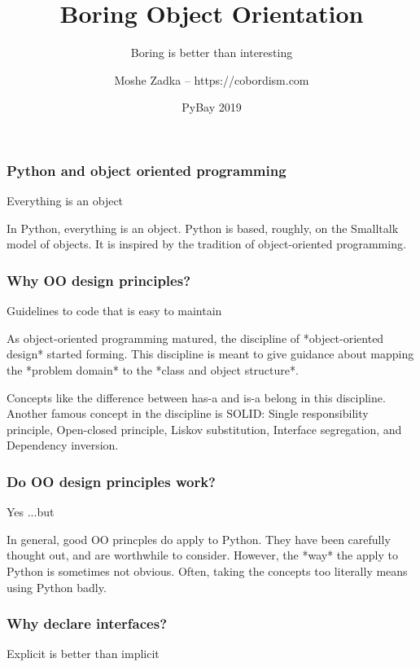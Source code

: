 \usepackage{listings}
\usepackage{textcomp}
\usepackage{fancyvrb}

\title{Boring Object Orientation}
\subtitle{Boring is better than interesting}
\author{Moshe Zadka -- https://cobordism.com}
\date{PyBay 2019}


\begin{titlepage}
\maketitle
\end{titlepage}

\frame{\titlepage}

\begin{frame}[fragile]
\frametitle{Python and object oriented programming}

Everything is an object
\end{frame}

In Python,
everything is an object.
Python is based,
roughly,
on the Smalltalk model of objects.
It is inspired by the tradition of object-oriented programming.

\begin{frame}[fragile]
\frametitle{Why OO design principles?}

Guidelines to code that is easy to maintain
\end{frame}

As object-oriented programming matured,
the discipline of
*object-oriented design* started forming.
This discipline is meant to give guidance
about mapping the
*problem domain*
to the
*class and object structure*.

Concepts like the difference between
has-a
and
is-a
belong in this discipline.
Another famous concept in the discipline
is
SOLID:
Single responsibility principle,
Open-closed principle,
Liskov substitution,
Interface segregation,
and Dependency inversion.

\begin{frame}[fragile]
\frametitle{Do OO design principles work?}

Yes
\pause
...but
\end{frame}

In general,
good OO princples do apply to Python.
They have been carefully thought out,
and are worthwhile to consider.
However,
the
*way*
the apply to Python is sometimes not obvious.
Often,
taking the concepts too literally means
using Python badly.

\begin{frame}[fragile]
\frametitle{Why declare interfaces?}

Explicit is better than implicit
\end{frame}

